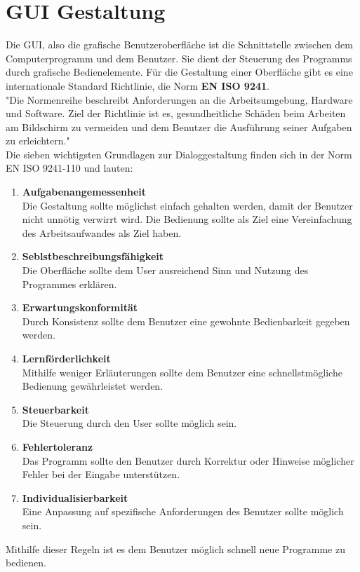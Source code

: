 \section{GUI Gestaltung}
Die \ac{GUI}, also die grafische Benutzeroberfläche ist die Schnittstelle zwischen dem Computerprogramm und dem Benutzer. Sie dient der Steuerung des Programms durch grafische Bedienelemente. Für die Gestaltung einer Oberfläche gibt es eine internationale Standard Richtlinie, die Norm \textbf{EN ISO 9241}. \\
"Die Normenreihe beschreibt Anforderungen an die Arbeitsumgebung, Hardware und Software. Ziel der Richtlinie ist es, gesundheitliche Schäden beim Arbeiten am Bildschirm zu vermeiden und dem Benutzer die Ausführung seiner Aufgaben zu erleichtern." \cite{WK9241} \\
Die sieben wichtigsten Grundlagen zur Dialoggestaltung finden sich in der Norm EN ISO 9241-110 und lauten:
\begin{enumerate}
\item \textbf{Aufgabenangemessenheit} \\
Die Gestaltung sollte möglichst einfach gehalten werden, damit der Benutzer nicht unnötig verwirrt wird. Die Bedienung sollte als Ziel eine Vereinfachung des Arbeitsaufwandes als Ziel haben.
\item \textbf{Seblstbeschreibungsfähigkeit} \\
Die Oberfläche sollte dem User ausreichend Sinn und Nutzung des Programmes erklären.
\item \textbf{Erwartungskonformität} \\
Durch Konsistenz sollte dem Benutzer eine gewohnte Bedienbarkeit gegeben werden.
\item \textbf{Lernförderlichkeit} \\
Mithilfe weniger Erläuterungen sollte dem Benutzer eine schnellstmögliche Bedienung gewährleistet werden.
\item \textbf{Steuerbarkeit} \\
Die Steuerung durch den User sollte möglich sein.
\item \textbf{Fehlertoleranz} \\
Das Programm sollte den Benutzer durch Korrektur oder Hinweise möglicher Fehler bei der Eingabe unterstützen.
\item \textbf{Individualisierbarkeit} \\
Eine Anpassung auf spezifische Anforderungen des Benutzer sollte möglich sein.
\end{enumerate}
Mithilfe dieser Regeln ist es dem Benutzer möglich schnell neue Programme zu bedienen. \\
